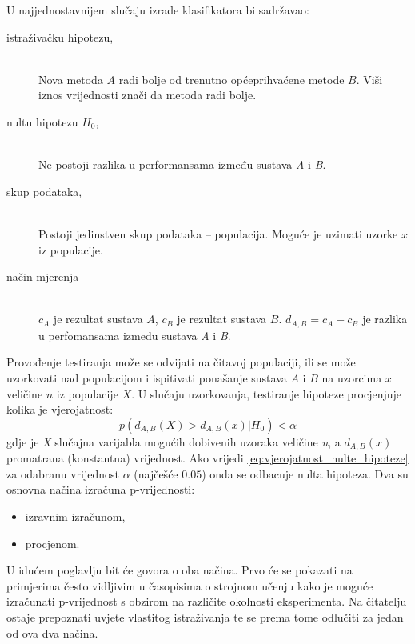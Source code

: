 U najjednostavnijem slučaju izrade klasifikatora bi sadržavao:
\begin{description}
  \item[istraživačku hipotezu,] \hfill \\
  Nova metoda $A$ radi bolje od trenutno općeprihvaćene metode $B$. Viši iznos vrijednosti znači da metoda radi bolje.
  \item[nultu hipotezu $H_0$,] \hfill \\
  Ne postoji razlika u performansama između sustava \textit{A} i \textit{B}.
  \item[skup podataka,] \hfill \\
  Postoji jedinstven skup podataka  -- populacija. Moguće je uzimati uzorke $x$ iz populacije.
  \item[način mjerenja] \hfill \\  
  $c_A$ je rezultat sustava $A$, $c_B$ je rezultat sustava $B$. $d_{A,B}=c_A-c_B$ je razlika u perfomansama između sustava \textit{A} i \textit{B}.
\end{description}
Provođenje testiranja može se odvijati na čitavoj populaciji, ili se može uzorkovati nad populacijom i ispitivati ponašanje sustava $A$ i $B$ na uzorcima $x$ veličine $n$ iz populacije $X$. U slučaju uzorkovanja, testiranje hipoteze procjenjuje kolika je vjerojatnost:
\begin{equation}
\label{eq:vjerojatnost_nulte_hipoteze}
p(d_{A,B}(X) > d_{A,B}(x) | H_{0}) < \alpha
\end{equation}
gdje je \textit{X} slučajna varijabla mogućih dobivenih uzoraka veličine \textit{n}, a $d_{A,B}(x)$ promatrana (konstantna) vrijednost. Ako vrijedi \ref{eq:vjerojatnost_nulte_hipoteze} za odabranu vrijednost $\alpha$ (najčešće $0.05$) onda se odbacuje nulta hipoteza. Dva su osnovna načina izračuna p-vrijednosti:
\begin{itemize}
\item izravnim izračunom,
\item procjenom.
\end{itemize}

U idućem poglavlju bit će govora o oba načina. Prvo će se pokazati na primjerima često vidljivim u časopisima o strojnom učenju kako je moguće izračunati p-vrijednost s obzirom na različite okolnosti eksperimenta. Na čitatelju ostaje prepoznati uvjete vlastitog istraživanja te se prema tome odlučiti za jedan od ova dva načina.

